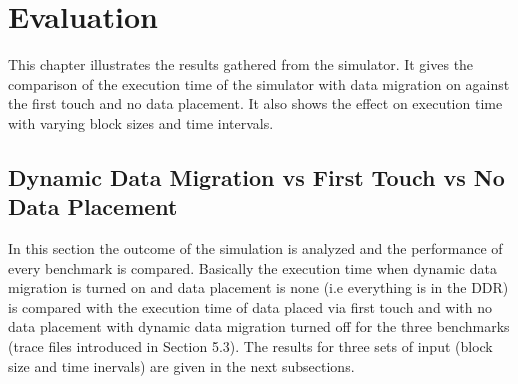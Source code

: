 \documentclass{listhesis}
\begin{document}
\chapter{Evaluation}
This chapter illustrates the results gathered from the simulator. It gives the comparison of the execution time of the simulator with data migration on against the first touch and no data placement. It also shows the effect on execution time with varying block sizes and time intervals.
\section{Dynamic Data Migration vs First Touch vs No Data Placement}
In this section the outcome of the simulation is analyzed and the performance of every benchmark is compared. Basically the execution time when dynamic data migration is turned on and data placement is none (i.e everything is in the DDR) is compared with the execution time of data placed via first touch and with no data placement with dynamic data migration turned off for the three benchmarks (trace files introduced in Section 5.3). The results for three sets of input (block size and time inervals) are given in the next subsections.\\
\end{document}
